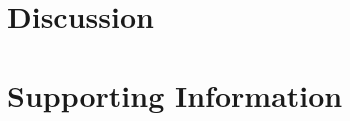 \documentclass[10pt,letterpaper]{article}
\newcommand{\lorem}{{\bf LOREM}}
\newcommand{\ipsum}{{\bf IPSUM}}
\begin{document}
\section*{Discussion}
%
%
%
%
\section*{Supporting Information}
\end{document}
